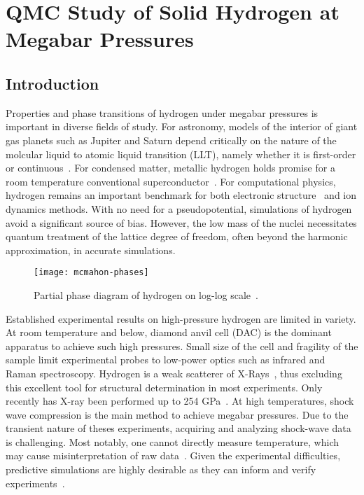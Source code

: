 \chapter{QMC Study of Solid Hydrogen at Megabar Pressures}

\section{Introduction}

Properties and phase transitions of hydrogen under megabar pressures is important in diverse fields of study. For astronomy, models of the interior of giant gas planets such as Jupiter and Saturn depend critically on the nature of the molcular liquid to atomic liquid transition (LLT), namely whether it is first-order or continuous~\cite{Hubbard2016,Wahl2017}. For condensed matter, metallic hydrogen holds promise for a room temperature conventional superconductor~\cite{McMahon2011,McMahon2012}. For computational physics, hydrogen remains an important benchmark for both electronic structure~\cite{Motta2017} and ion dynamics methods. With no need for a pseudopotential, simulations of hydrogen avoid a significant source of bias. However, the low mass of the nuclei necessitates quantum treatment of the lattice degree of freedom, often beyond the harmonic approximation, in accurate simulations.

\begin{figure}[h]
\centering
\texttt{[image: mcmahon-phases]}
\caption{Partial phase diagram of hydrogen on log-log scale~\cite{McMahon2012rmp}.}
\end{figure}

Established experimental results on high-pressure hydrogen are limited in variety. At room temperature and below, diamond anvil cell (DAC) is the dominant apparatus to achieve such high pressures. Small size of the cell and fragility of the sample limit experimental probes to low-power optics such as infrared and Raman spectroscopy\cite{RangaI.F.2017}. Hydrogen is a weak scatterer of X-Rays~\cite{Zha2014}, thus excluding this excellent tool for structural determination in most experiments. Only recently has X-ray been performed up to 254 GPa~\cite{Akahama2010,Ji2019}.
At high temperatures, shock wave compression is the main method to achieve megabar pressures. Due to the transient nature of theses experiments, acquiring and analyzing shock-wave data is challenging. Most notably, one cannot directly measure temperature, which may cause misinterpretation of raw data~\cite{Celliers2018,Knudson2004,Knudson2017}.
Given the experimental difficulties, predictive simulations are highly desirable as they can inform and verify experiments~\cite{Pierleoni2016b}.

